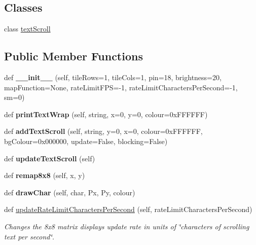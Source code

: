 \subsection*{Classes}
\begin{DoxyCompactItemize}
\item 
class \hyperlink{classglowbit_1_1matrix8x8_1_1textScroll}{text\+Scroll}
\end{DoxyCompactItemize}
\subsection*{Public Member Functions}
\begin{DoxyCompactItemize}
\item 
\mbox{\label{classglowbit_1_1matrix8x8_a7b30f3aec73c8a938a063ea640899af6}} 
def {\bfseries \+\_\+\+\_\+init\+\_\+\+\_\+} (self, tile\+Rows=1, tile\+Cols=1, pin=18, brightness=20, map\+Function=None, rate\+Limit\+F\+PS=-\/1, rate\+Limit\+Characters\+Per\+Second=-\/1, sm=0)
\item 
\mbox{\label{classglowbit_1_1matrix8x8_a1db0574d73977d46ba90068b9970777f}} 
def {\bfseries print\+Text\+Wrap} (self, string, x=0, y=0, colour=0x\+F\+F\+F\+F\+F\+F)
\item 
\mbox{\label{classglowbit_1_1matrix8x8_ade5b8578e6c38d86f356cdb6997cc314}} 
def {\bfseries add\+Text\+Scroll} (self, string, y=0, x=0, colour=0x\+F\+F\+F\+F\+F\+F, bg\+Colour=0x000000, update=\+False, blocking=\+False)
\item 
\mbox{\label{classglowbit_1_1matrix8x8_a4a529f9b42ea95cc0f5dafcb0085d096}} 
def {\bfseries update\+Text\+Scroll} (self)
\item 
\mbox{\label{classglowbit_1_1matrix8x8_a67146ad236571bf9e87fe7a847c8a1d1}} 
def {\bfseries remap8x8} (self, x, y)
\item 
\mbox{\label{classglowbit_1_1matrix8x8_a4ba16a1fa6231654833d619f8789275a}} 
def {\bfseries draw\+Char} (self, char, Px, Py, colour)
\item 
def \hyperlink{classglowbit_1_1matrix8x8_a5dfbe10ccf2acca4d6d4012e29e7b439}{update\+Rate\+Limit\+Characters\+Per\+Second} (self, rate\+Limit\+Characters\+Per\+Second)
\begin{DoxyCompactList}\small\item\em Changes the 8x8 matrix display\textquotesingle{}s update rate in units of \char`\"{}characters of scrolling text per second\char`\"{}. \end{DoxyCompactList}\end{DoxyCompactItemize}
